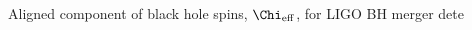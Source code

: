  \label{fig:BHspin} Aligned component of black hole spins, $\Chi_{\rm eff}$, for LIGO BH merger dete
